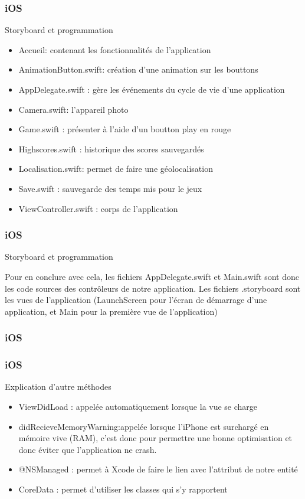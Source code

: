 \documentclass{beamer}
\begin{document}
\begin{frame}
\frametitle{iOS}
\begin{block}{Storyboard et programmation }
		 \begin{itemize}
\item {Accueil:  contenant les fonctionnalités de l'application} 
    	\item {AnimationButton.swift: création d'une animation sur les bouttons }
   	 \item {AppDelegate.swift : gère les événements du cycle de vie d'une application}
 	  \item {Camera.swift: l'appareil photo}	
  	  \item {Game.swift : présenter à l'aide d'un boutton play en rouge}
	 \item {Highscores.swift : historique des scores sauvegardés }
	    \item {Localisation.swift: permet de faire une  géolocalisation}
	    \item {Save.swift : sauvegarde des temps mis pour le jeux}
	    \item {ViewController.swift : corps de l'application}
  \end{itemize}
	\end{block}

\end{frame}


\begin{frame}
	\frametitle{iOS}
	\begin{block}{Storyboard et programmation}
	\par Pour en conclure avec cela, les fichiers AppDelegate.swift et Main.swift sont donc les code sources des contrôleurs de notre application. Les fichiers .storyboard sont les vues de l’application (LaunchScreen pour l’écran de démarrage d’une application, et Main pour la première vue de l’application)
	\end{block}
\end{frame}


\begin{frame}
\frametitle{iOS}
	\frametitle{iOS}
	\begin{block}{Explication d'autre méthodes}
	 \begin{itemize}
	\item {ViewDidLoad :  appelée automatiquement lorsque la vue se charge } 
    	\item {didRecieveMemoryWarning:appelée lorsque l’iPhone est surchargé en mémoire vive (RAM), c’est donc pour permettre une bonne optimisation et donc éviter que l’application ne crash.}
\item {@NSManaged :  permet à Xcode de faire le lien avec l'attribut de notre entité } 
\item {CoreData :  permet d'utiliser les classes qui s'y rapportent } 
 	
  \end{itemize}
	\end{block}
\end{frame}
\end{document}
